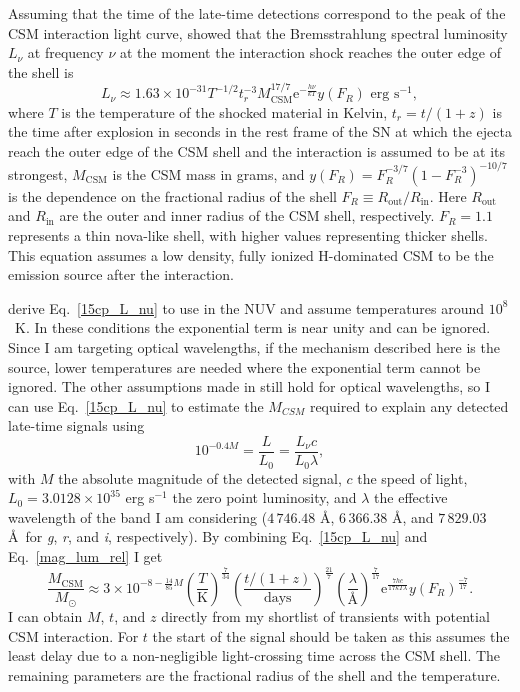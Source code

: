 \documentclass[a4paper,oneside,12pt, class=Latex/Classes/PhDthesisPSnPDF, crop=false]{standalone}
\begin{document}
Assuming that the time of the late-time detections correspond to the peak of the CSM interaction light curve, \citet{2015cp} showed that the Bremsstrahlung spectral luminosity $L_\nu$ at frequency $\nu$ at the moment the interaction shock reaches the outer edge of the shell is
\begin{equation}
    \label{15cp_L_nu}
    L_\nu \approx 1.63 \times 10^{-31} T^{-1/2} t_r^{-3} M_\text{CSM}^{17/7} \text{e}^{-\frac{h\nu}{kT}} y(F_R) \text{ erg s}^{-1},
\end{equation}
where $T$ is the temperature of the shocked material in Kelvin, $t_r = t/(1+z)$ is the time after explosion in seconds in the rest frame of the SN at which the ejecta reach the outer edge of the CSM shell and the interaction is assumed to be at its strongest, $M_\text{CSM}$ is the CSM mass in grams, and $y(F_R) = F_R^{-3/7}(1-F_R^{-3})^{-10/7}$ is the dependence on the fractional radius of the shell $F_R \equiv R_\text{out} / R_\text{in}$. Here $R_\text{out}$ and $R_\text{in}$ are the outer and inner radius of the CSM shell, respectively. $F_R = 1.1$ represents a thin nova-like shell, with higher values representing thicker shells. This equation assumes a low density, fully ionized H-dominated CSM to be the emission source after the interaction. 

\citet{2015cp} derive Eq.~\ref{15cp_L_nu} to use in the NUV and assume temperatures around $10^8$~K. In these conditions the exponential term is near unity and can be ignored. Since I am targeting optical wavelengths, if the mechanism described here is the source, lower temperatures are needed where the exponential term cannot be ignored. The other assumptions made in \citet{2015cp} still hold for optical wavelengths, so I can use Eq.~\ref{15cp_L_nu} to estimate the $M_{CSM}$ required to explain any detected late-time signals using
\begin{equation}
    \label{mag_lum_rel}
    10^{-0.4M} = \frac{L}{L_0} = \frac{L_\nu c}{L_0 \lambda},
\end{equation}
with $M$ the absolute magnitude of the detected signal, $c$ the speed of light, $L_0 = 3.0128 \times 10^{35}$ erg s$^{-1}$ the zero point luminosity, and $\lambda$ the effective wavelength of the band I am considering ($4\,746.48$ \AA, $6\,366.38$ \AA, and $7\,829.03$ \AA~for \textit{g}, \textit{r}, and \textit{i}, respectively). By combining Eq.~\ref{15cp_L_nu} and Eq.~\ref{mag_lum_rel} I get
\begin{equation}
    \frac{M_\text{CSM}}{M_\odot} \approx 3 \times 10^{-8-\frac{14}{85}M} \left(\frac{T}{\text{K}}\right)^{\frac{7}{34}} \left(\frac{t/(1+z)}{\text{days}}\right)^{\frac{21}{7}} \left(\frac{\lambda}{\text{\AA}}\right)^{\frac{7}{17}} \text{e}^{\frac{7hc}{17kT\lambda}} y(F_R)^{\frac{-7}{17}}.
    \label{M_CSM_eq}
\end{equation}
I can obtain $M$, $t$, and $z$ directly from my shortlist of transients with potential CSM interaction. For $t$ the start of the signal should be taken as this assumes the least delay due to a non-negligible light-crossing time across the CSM shell. The remaining parameters are the fractional radius of the shell and the temperature.
\end{document}
